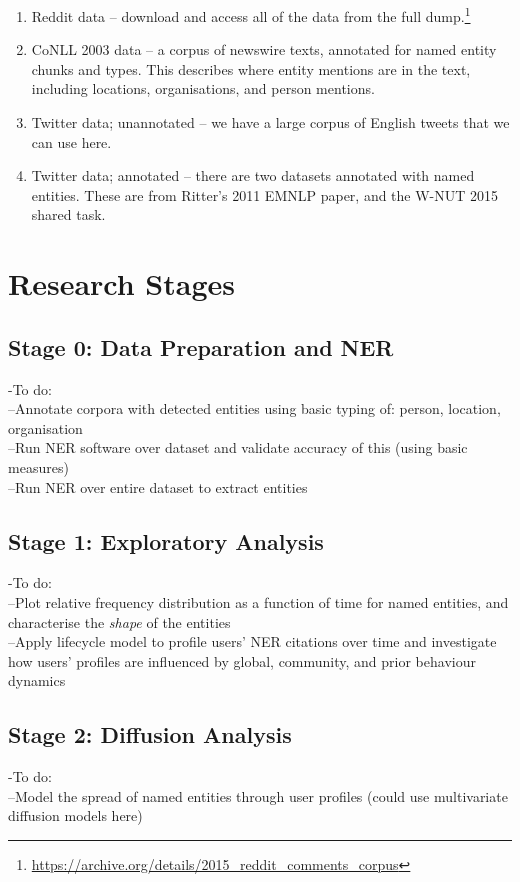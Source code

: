 \documentclass[journal,10pt,draftclsnofoot,onecolumn]{IEEEtran}
\begin{document}
\begin{enumerate}
	\item Reddit data -- download and access all of the data from the full dump.\footnote{\url{https://archive.org/details/2015_reddit_comments_corpus}}
	\item CoNLL 2003 data -- a corpus of newswire texts, annotated for named entity chunks and types.
	This describes where entity mentions are in the text, including locations, organisations, and person mentions.
	\item Twitter data; unannotated -- we have a large corpus of English tweets that we can use here.
	\item Twitter data; annotated -- there are two datasets annotated with named entities. These are from Ritter's 2011 EMNLP paper, and the W-NUT 2015 shared task.
\end{enumerate}


\section{Research Stages}

\subsection{Stage 0: Data Preparation and NER}
-To do:\\
--Annotate corpora with detected entities using basic typing of: person, location, organisation\\
--Run NER software over dataset and validate accuracy of this (using basic measures)\\
--Run NER over entire dataset to extract entities

\subsection{Stage 1: Exploratory Analysis}
-To do:\\
--Plot relative frequency distribution as a function of time for named entities, and characterise the \emph{shape} of the entities\\
--Apply lifecycle model to profile users' NER citations over time and investigate how users' profiles are influenced by global, community, and prior behaviour dynamics

\subsection{Stage 2: Diffusion Analysis}
-To do:\\
--Model the spread of named entities through user profiles (could use multivariate diffusion models here)
\end{document}
